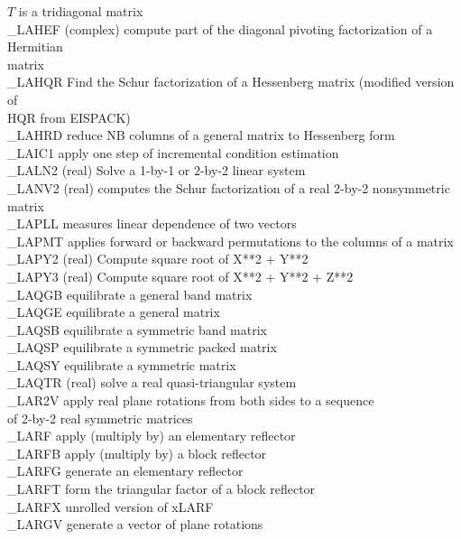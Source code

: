 \begin{tabbing}
        \> $T$ is a tridiagonal matrix \\
\_LAHEF \> (complex) compute part of the diagonal pivoting factorization of a Hermitian \\
        \> matrix\\
\_LAHQR \> Find the Schur factorization of a Hessenberg matrix (modified version of \\
        \> HQR from EISPACK)\\
\_LAHRD \> reduce NB columns of a general matrix to Hessenberg form\\
\_LAIC1 \> apply one step of incremental condition estimation \\
\_LALN2 \> (real) Solve a 1-by-1 or 2-by-2 linear system\\
\_LANV2 \> (real) computes the Schur factorization of a real 2-by-2
nonsymmetric matrix \\
\_LAPLL \> measures linear dependence of two vectors \\
\_LAPMT \> applies forward or backward permutations to the columns of a matrix \\
\_LAPY2 \> (real) Compute square root of X**2 + Y**2\\
\_LAPY3 \> (real) Compute square root of X**2 + Y**2 + Z**2\\
\_LAQGB \> equilibrate a general band matrix \\
\_LAQGE \> equilibrate a general matrix \\
\_LAQSB \> equilibrate a symmetric band matrix \\
\_LAQSP \> equilibrate a symmetric packed matrix \\
\_LAQSY \> equilibrate a symmetric matrix \\
\_LAQTR \> (real) solve a real quasi-triangular system \\
\_LAR2V \> apply real plane rotations from both sides to a sequence \\
        \> of 2-by-2 real symmetric matrices \\
\_LARF  \> apply (multiply by) an elementary reflector \\
\_LARFB \> apply (multiply by) a block reflector \\
\_LARFG \> generate an elementary reflector \\
\_LARFT \> form the triangular factor of a block reflector \\
\_LARFX \> unrolled version of xLARF \\
\_LARGV \> generate a vector of plane rotations \\

\end{tabbing}
